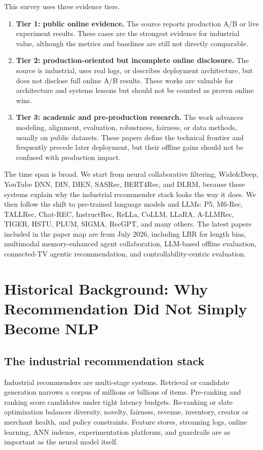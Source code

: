 \documentclass[11pt]{article}
\begin{document}
This survey uses three evidence tiers.

\begin{enumerate}
  \item \textbf{Tier 1: public online evidence.} The source reports production A/B or live experiment results. These cases are the strongest evidence for industrial value, although the metrics and baselines are still not directly comparable.
  \item \textbf{Tier 2: production-oriented but incomplete online disclosure.} The source is industrial, uses real logs, or describes deployment architecture, but does not disclose full online A/B results. These works are valuable for architecture and systems lessons but should not be counted as proven online wins.
  \item \textbf{Tier 3: academic and pre-production research.} The work advances modeling, alignment, evaluation, robustness, fairness, or data methods, usually on public datasets. These papers define the technical frontier and frequently precede later deployment, but their offline gains should not be confused with production impact.
\end{enumerate}

The time span is broad. We start from neural collaborative filtering, Wide\&Deep, YouTube DNN, DIN, DIEN, SASRec, BERT4Rec, and DLRM, because these systems explain why the industrial recommender stack looks the way it does. We then follow the shift to pre-trained language models and LLMs: P5, M6-Rec, TALLRec, Chat-REC, InstructRec, ReLLa, CoLLM, LLaRA, A-LLMRec, TIGER, HSTU, PLUM, SIGMA, RecGPT, and many others. The latest papers included in the paper map are from July 2026, including LBR for length bias, multimodal memory-enhanced agent collaboration, LLM-based offline evaluation, connected-TV agentic recommendation, and controllability-centric evaluation.

\section{Historical Background: Why Recommendation Did Not Simply Become NLP}

\subsection{The industrial recommendation stack}

Industrial recommenders are multi-stage systems. Retrieval or candidate generation narrows a corpus of millions or billions of items. Pre-ranking and ranking score candidates under tight latency budgets. Re-ranking or slate optimization balances diversity, novelty, fairness, revenue, inventory, creator or merchant health, and policy constraints. Feature stores, streaming logs, online learning, ANN indexes, experimentation platforms, and guardrails are as important as the neural model itself.
\end{document}
